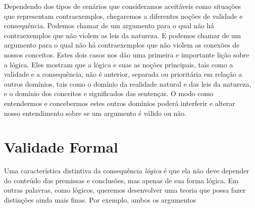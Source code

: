 Dependendo dos tipos de cenários que consideramos aceitáveis como situações que representam contraexemplos, chegaremos a diferentes noções de validade e consequência.
Podemos chamar de  um argumento para o qual não há contraexemplos que não violem as leis da natureza.
E podemos chamar de  um argumento para o qual não há contraexemplos que não violem as conexões de nossos conceitos.
Estes dois casos nos dão uma primeira e importante lição sobre a lógica.
Eles mostram que a lógica e suas as noções principais, tais como a validade e a consequência, não é anterior, separada ou prioritária em relação a outros domínios, tais como o domínio da realidade natural e das leis da natureza, e o domínio dos conceitos e significados das sentenças.
O modo como entendermos e concebermos estes outros domínios poderá interferir e alterar nosso entendimento sobre se um argumento é válido ou não.


\section{Validade Formal}

Uma característica distintiva da consequência \emph{lógica} é que ela não deve depender do conteúdo das premissas e conclusões, mas apenas de sua forma lógica.
Em outras palavras, como lógicos, queremos desenvolver uma teoria que possa fazer distinções ainda mais finas. Por exemplo, ambos os argumentos

